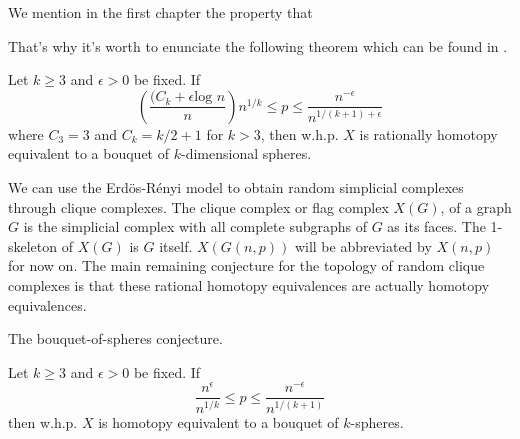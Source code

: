 We mention in the first chapter the property that 


That's why it's worth to enunciate the following theorem which can be found in \cite[Khale, 16]{Khale}.
\begin{theorem}
Let $k \geq 3$ and $\epsilon > 0$ be fixed. If
$$\left(\frac{(C_{k} + \epsilon \text{log } n} {n} \right) n^{1/k} \leq p \leq \frac{n^{-\epsilon}}{n^{1/(k+1)+\epsilon}}$$
where $C_{3} = 3$ and $C_{k} = k/2 + 1$ for $k > 3$, then w.h.p. $X$ is rationally homotopy
equivalent to a bouquet of $k$-dimensional spheres.
\end{theorem}

We can use the Erdös-Rényi model to obtain random simplicial complexes through clique complexes. The clique complex or flag complex $X(G)$, of a graph $G$ is the simplicial complex with all complete subgraphs of $G$ as its faces. The 1-skeleton of $X(G)$ is $G$ itself. $X(G(n, p))$ will be abbreviated by $X(n, p)$ for now on.
The main remaining conjecture for the topology of random clique complexes is that these rational homotopy equivalences are actually homotopy equivalences.

\begin{conje}
The bouquet-of-spheres conjecture.

Let $k \geq 3$ and $\epsilon > 0$ be fixed. If
$$\frac{n^{\epsilon}}{n^{1/k}} \leq p \leq \frac{n^{-\epsilon}}{n^{1/(k+1)}}$$
then w.h.p. $X$ is homotopy equivalent to a bouquet of $k$-spheres.
\end{conje}